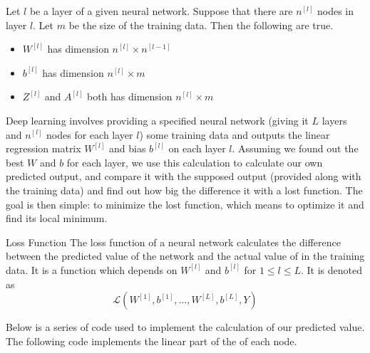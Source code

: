 \documentclass[a4paper]{article}
\begin{document}
\begin{thm}{}{} Let $l$ be a layer of a given neural network. Suppose that there are $n^{[l]}$ nodes in layer $l$. Let $m$ be the size of the training data. Then the following are true. 
\begin{itemize}
\item $W^{[l]}$ has dimension $n^{[l]}\times n^{[l-1]}$
\item $b^{[l]}$ has dimension $n^{[l]}\times m$
\item $Z^{[l]}$ and $A^{[l]}$ both has dimension $n^{[l]}\times m$
\end{itemize}
\end{thm}

Deep learning involves providing a specified neural network (giving it $L$ layers and $n^{[l]}$ nodes for each layer $l$) some training data and outputs the linear regression matrix $W^{[l]}$ and bias $b^{[l]}$ on each layer $l$. Assuming we found out the best $W$ and $b$ for each layer, we use this calculation to calculate our own predicted output, and compare it with the supposed output (provided along with the training data) and find out how big the difference it with a lost function. The goal is then simple: to minimize the lost function, which means to optimize it and find its local minimum. 

\begin{defn}{Loss Function}{} The loss function of a neural network calculates the difference between the predicted value of the network and the actual value of in the training data. It is a function which depends on $W^{[l]}$ and $b^{[l]}$ for $1\leq l\leq L$. It is denoted as $$\mathcal{L}(W^{[1]},b^{[1]},\dots,W^{[L]},b^{[L]},Y)$$
\end{defn}

Below is a series of code used to implement the calculation of our predicted value. 
The following code implements the linear part of the of each node. 
\end{document}
